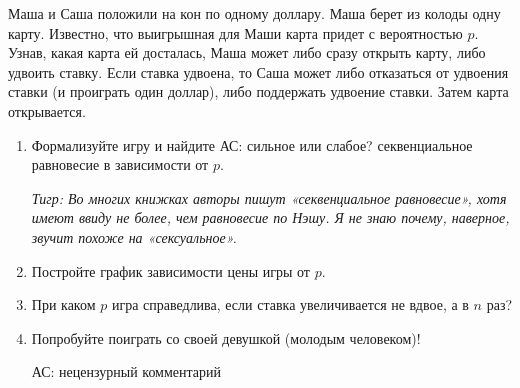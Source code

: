 \begin{problem}
Маша и Саша положили на кон по одному доллару. Маша берет из колоды одну карту. Известно, что выигрышная для Маши карта придет с вероятностью  $p$. Узнав, какая карта ей досталась, Маша может либо сразу открыть карту, либо удвоить ставку. Если ставка удвоена, то Саша может либо отказаться от удвоения ставки (и проиграть один доллар), либо поддержать удвоение ставки. Затем карта открывается.\par
\begin{enumerate}
\item Формализуйте игру и найдите {\red АС: сильное или слабое?} секвенциальное равновесие в зависимости от  $p$. \par
{\it Тигр: Во многих книжках авторы пишут «секвенциальное равновесие», хотя имеют ввиду не более, чем равновесие по Нэшу. Я не знаю почему, наверное, звучит похоже на «сексуальное».}\par
\item Постройте график зависимости цены игры от  $p$.\par
\item  При каком  $p$  игра справедлива, если ставка увеличивается не вдвое, а в  $n$  раз?\par
\item Попробуйте поиграть со своей девушкой (молодым человеком)!\par {\red АС: нецензурный комментарий}
\end{enumerate}


\begin{sol}

\end{sol}
\end{problem}



